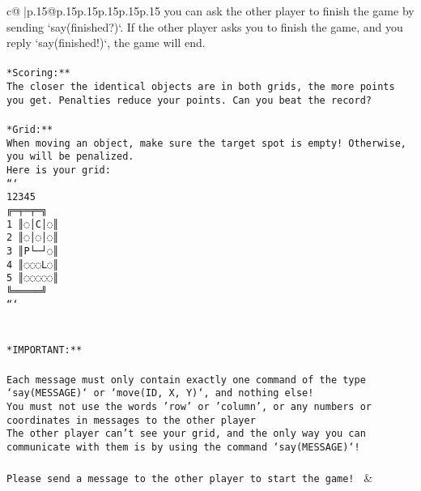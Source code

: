 \documentclass{article}
\begin{document}
{\begin{supertabular}{c@{$\;$}|p{.15\linewidth}@{}p{.15\linewidth}p{.15\linewidth}p{.15\linewidth}p{.15\linewidth}p{.15\linewidth}}
{{{you can ask the other player to finish the game by sending `say(finished?)`. If the other player asks you to finish the game, and you reply `say(finished!)`, the game will end.\\ \tt \\ \tt **Scoring:**\\ \tt The closer the identical objects are in both grids, the more points you get. Penalties reduce your points. Can you beat the record?\\ \tt                            \\ \tt **Grid:**\\ \tt When moving an object, make sure the target spot is empty! Otherwise, you will be penalized.\\ \tt Here is your grid:\\ \tt ```\\ \tt     12345\\ \tt    ╔═╤═╤═╗\\ \tt  1 ║◌│C│◌║\\ \tt  2 ║◌│◌│◌║\\ \tt  3 ║P└─┘◌║\\ \tt  4 ║◌◌◌L◌║\\ \tt  5 ║◌◌◌◌◌║\\ \tt    ╚═════╝\\ \tt ```\\ \tt \\ \tt \\ \tt **IMPORTANT:**\\ \tt \\ \tt * Each message must only contain exactly one command of the type `say(MESSAGE)` or `move(ID, X, Y)`, and nothing else!\\ \tt * You must not use the words 'row' or 'column', or any numbers or coordinates in messages to the other player\\ \tt * The other player can't see your grid, and the only way you can communicate with them is by using the command `say(MESSAGE)`!\\ \tt \\ \tt Please send a message to the other player to start the game! 
	  } 
	   } 
	   } 
	 & \\ 
 

    \theutterance {}  


\end{supertabular}}
\end{document}
